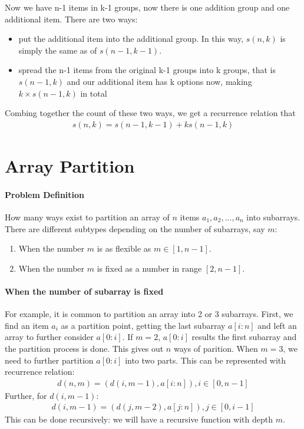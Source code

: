 \documentclass[../main.tex]{subfiles}
\begin{document}
Now we have n-1 items in k-1 groups, now there is one addition group and one additional item. There are two ways:
\begin{itemize}
    \item put the additional item into the additional group. In this way, $s(n,k)$ is simply the same as of $s(n-1,k-1)$.
    \item spread the n-1 items from the original k-1 groups into k groups, that is $s(n-1, k)$ and our additional item has k options now, making $k\times s(n-1,k)$ in total
\end{itemize}
Combing together the count of these two ways, we get a recurrence relation that
\begin{align}
    s(n,k)=s(n-1,k-1)+k s(n-1,k)
\end{align}

\section{Array Partition}
\paragraph{Problem Definition} How many ways exist to partition an array of $n$ items ${a_1, a_2, ..., a_n}$ into subarrays. There are different subtypes depending on the number of subarrays, say $m$:
\begin{enumerate}
    \item When the number $m$ is as flexible as $m\in[1, n-1]$.
    \item When the number $m$ is fixed as a number in range $[2, n-1]$.
\end{enumerate}

\paragraph{When the number of subarray is fixed} For example, it is common to partition an array into 2 or 3 subarrays. First, we find an item $a_i$ as a  partition point,  getting the last subarray $a[i:n]$ and left an array to further consider $a[0:i]$. If $m=2$, $a[0:i]$ results the first subarray and the partition process is done. This gives out $n$ ways of parition. When $m=3$, we need to further partition $a[0:i]$ into two parts. This can be represented with recurrence relation:
\begin{align}
    d(n, m) = (d(i, m-1), a[i:n]), i \in[0, n-1]
\end{align}
Further, for $d(i, m-1)$:
\begin{align}
    d(i, m-1) = (d(j, m-2), a[j:n]), j \in[0, i-1]
\end{align}
This can be done recursively: we will have a recursive function with depth $m$.
\end{document}
